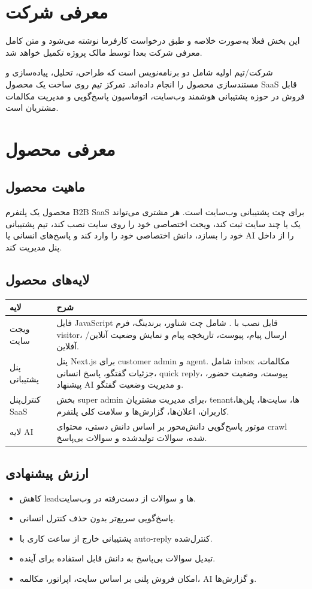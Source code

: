 \documentclass[12pt,a4paper]{article}
\newcommand{\en}[1]{\lr{#1}}
\newcommand{\code}[1]{\lr{\texttt{\detokenize{#1}}}}
\begin{document}
\section{معرفی شرکت}
این بخش فعلا به‌صورت خلاصه و طبق درخواست کارفرما نوشته می‌شود و متن کامل معرفی شرکت بعدا توسط مالک پروژه تکمیل خواهد شد.

شرکت/تیم اولیه شامل دو برنامه‌نویس است که طراحی، تحلیل، پیاده‌سازی و مستندسازی محصول \en{AI Chat SaaS} را انجام داده‌اند. تمرکز تیم روی ساخت یک محصول SaaS قابل فروش در حوزه پشتیبانی هوشمند وب‌سایت، اتوماسیون پاسخ‌گویی و مدیریت مکالمات مشتریان است.

\section{معرفی محصول}
\subsection{ماهیت محصول}
محصول یک پلتفرم B2B SaaS برای چت پشتیبانی وب‌سایت است. هر مشتری می‌تواند یک یا چند سایت ثبت کند، ویجت اختصاصی خود را روی سایت نصب کند، تیم پشتیبانی خود را بسازد، دانش اختصاصی خود را وارد کند و پاسخ‌های انسانی یا AI را از داخل پنل مدیریت کند.

\subsection{لایه‌های محصول}
\begin{longtable}{R{36mm} R{112mm}}
\toprule
\textbf{لایه} & \textbf{شرح} \\
\midrule
\endhead
ویجت سایت & فایل JavaScript قابل نصب با \code{site_key}. شامل چت شناور، برندینگ، فرم visitor، ارسال پیام، پیوست، تاریخچه پیام و نمایش وضعیت آنلاین/آفلاین. \\
پنل پشتیبانی & پنل Next.js برای customer admin و agent. شامل inbox مکالمات، جزئیات گفتگو، پاسخ انسانی، quick reply، پیوست، وضعیت حضور، پیشنهاد AI و مدیریت وضعیت گفتگو. \\
کنترل‌پنل SaaS & بخش super admin برای مدیریت مشتریان، tenantها، سایت‌ها، پلن‌ها، کاربران، اعلان‌ها، گزارش‌ها و سلامت کلی پلتفرم. \\
لایه AI & موتور پاسخ‌گویی دانش‌محور بر اساس دانش دستی، محتوای crawl شده، سوالات تولیدشده و سوالات بی‌پاسخ. \\
\bottomrule
\end{longtable}

\subsection{ارزش پیشنهادی}
\begin{itemize}
  \item کاهش leadها و سوالات از دست‌رفته در وب‌سایت.
  \item پاسخ‌گویی سریع‌تر بدون حذف کنترل انسانی.
  \item پشتیبانی خارج از ساعت کاری با auto-reply کنترل‌شده.
  \item تبدیل سوالات بی‌پاسخ به دانش قابل استفاده برای آینده.
  \item امکان فروش پلنی بر اساس سایت، اپراتور، مکالمه، AI و گزارش‌ها.
\end{itemize}
\end{document}
